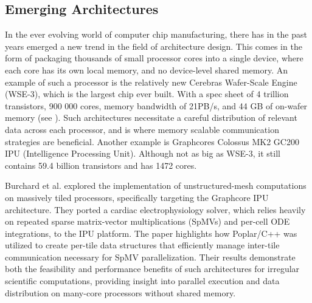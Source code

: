 \subsection{Emerging Architectures}
In the ever evolving world of computer chip manufacturing, there has in the past years emerged a new trend in the field of architecture design. This comes in the form of packaging thousands of small processor cores into a single device, where each core has its own local memory, and no device-level shared memory. An example of such a processor is the relatively new Cerebras Wafer-Scale Engine (WSE-3), which is the largest chip ever built. With a spec sheet of 4 trillion transistors, 900 000 cores, memory bandwidth of 21PB/s, and 44 GB of on-wafer memory (see \cite{cerebras2024wse3}). Such architectures necessitate a careful distribution of relevant data across each processor, and is where memory scalable communication strategies are beneficial. Another example is Graphcores Colossus MK2 GC200 IPU (Intelligence Processing Unit). Although not as big as WSE-3, it still contains 59.4 billion transistors and has 1472 cores.
\medskip

Burchard et al. \cite{10.3389/fphy.2023.979699} explored the implementation of unstructured-mesh computations on massively tiled processors, specifically targeting the Graphcore IPU architecture. They ported a cardiac electrophysiology solver, which relies heavily on repeated sparse matrix-vector multiplications (SpMVs) and per-cell ODE integrations, to the IPU platform. The paper highlights how Poplar/C++ was utilized to create per-tile data structures that efficiently manage inter-tile communication necessary for SpMV parallelization. Their results demonstrate both the feasibility and performance benefits of such architectures for irregular scientific computations, providing insight into parallel execution and data distribution on many-core processors without shared memory.

